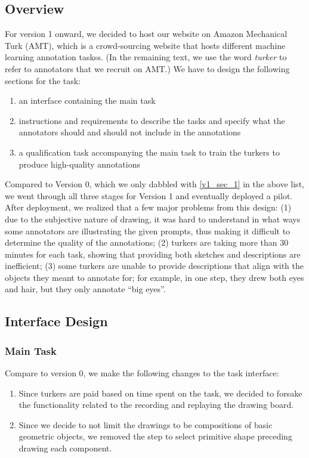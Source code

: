 \subsection{Overview}
For version 1 onward, we decided to host our website on Amazon Mechanical Turk (AMT), which is a crowd-sourcing website that hosts different machine learning annotation taskss. (In the remaining text, we use the word \textit{turker} to refer to annotators that we recruit on AMT.) 
We have to design the following sections for the task: 
\begin{enumerate}
    \item \label{v1_sec_1} an interface containing the main task
    \item instructions and requirements to describe the tasks and specify what the annotators should and should not include in the annotations
    \item a qualification task accompanying the main task to train the turkers to produce high-quality annotations
\end{enumerate}
Compared to Version 0, which we only dabbled with \ref{v1_sec_1} in the above list, we went through all three stages for Version 1 and eventually deployed a pilot.
After deployment, we realized that a few major problems from this design: (1) due to the subjective nature of drawing, it was hard to understand in what ways some annotators are illustrating the given prompts, thus making it difficult to determine the quality of the annotations; (2) turkers are taking more than 30 minutes for each task, showing that providing both sketches and descriptions are inefficient; (3) some turkers are unable to provide descriptions that align with the objects they meant to annotate for; for example, in one step, they drew both eyes and hair, but they only annotate ``big eyes''.      


\subsection{Interface Design}

\subsubsection{Main Task}
Compare to version 0, we make the following changes to the task interface: 
\begin{enumerate}
    \item Since turkers are paid based on time spent on the task, we decided to forsake the functionality related to the recording and replaying the drawing board.
    \item Since we decide to not limit the drawings to be compositions of basic geometric objects, we removed the step to select primitive shape preceding drawing each component.
\end{enumerate}

